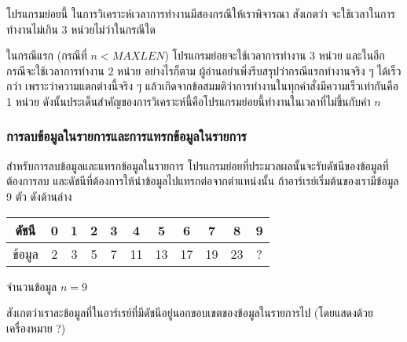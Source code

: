 โปรแกรม{\wbr}ย่อย{\wbr}นี้ ใน{\wbr}การ{\wbr}วิเคราะห์{\wbr}เวลา{\wbr}การ{\wbr}ทำงาน{\wbr}มี{\wbr}สอง{\wbr}กรณี{\wbr}ให้{\wbr}เรา{\wbr}พิจารณา สังเกต{\wbr}ว่า{\wbr}
จะ{\wbr}ใช้{\wbr}เวลา{\wbr}ใน{\wbr}การ{\wbr}ทำงาน{\wbr}ไม่{\wbr}เกิน $3$ หน่วย{\wbr}ไม่{\wbr}ว่า{\wbr}ใน{\wbr}กรณี{\wbr}ใด 

ใน{\wbr}กรณี{\wbr}แรก (กรณี{\wbr}ที่ $n<MAXLEN$) โปรแกรม{\wbr}ย่อย{\wbr}จะ{\wbr}ใช้{\wbr}เวลา{\wbr}การ{\wbr}ทำงาน $3$ หน่วย{\wbr}
และ{\wbr}ใน{\wbr}อีก{\wbr}กรณี{\wbr}จะ{\wbr}ใช้{\wbr}เวลา{\wbr}การ{\wbr}ทำงาน $2$ หน่วย อย่างไร{\wbr}ก็{\wbr}ตาม{\wbr}
ผู้{\wbr}อ่าน{\wbr}อย่า{\wbr}เพิ่ง{\wbr}รีบ{\wbr}สรุป{\wbr}ว่า{\wbr}กรณี{\wbr}แรก{\wbr}ทำงาน{\wbr}จริง ๆ ได้{\wbr}เร็ว{\wbr}กว่า เพราะ{\wbr}ว่า{\wbr}ความ{\wbr}แตก{\wbr}ต่าง{\wbr}นี้{\wbr}จริง ๆ
แล้ว{\wbr}เกิด{\wbr}จาก{\wbr}ข้อ{\wbr}สมมติ{\wbr}ว่า{\wbr}การ{\wbr}ทำงาน{\wbr}ใน{\wbr}ทุก{\wbr}คำ{\wbr}สั่ง{\wbr}มี{\wbr}ความ{\wbr}เร็ว{\wbr}เท่า{\wbr}กัน{\wbr}คือ 1 หน่วย{\wbr}
ดังนั้น{\wbr}ประเด็น{\wbr}สำคัญ{\wbr}ของ{\wbr}การ{\wbr}วิเคราะห์{\wbr}นี้{\wbr}คือ{\wbr}โปรแกรม{\wbr}ย่อย{\wbr}นี้{\wbr}ทำงาน{\wbr}ใน{\wbr}เวลา{\wbr}ที่{\wbr}ไม่{\wbr}ขึ้น{\wbr}กับ{\wbr}ค่า $n$

\subsubsection{การ{\wbr}ลบ{\wbr}ข้อมูล{\wbr}ใน{\wbr}รายการ{\wbr}และ{\wbr}การ{\wbr}แทรก{\wbr}ข้อมูล{\wbr}ใน{\wbr}รายการ}

สำหรับ{\wbr}การ{\wbr}ลบ{\wbr}ข้อมูล{\wbr}และ{\wbr}แทรก{\wbr}ข้อมูล{\wbr}ใน{\wbr}รายการ{\wbr}
โปรแกรม{\wbr}ย่อย{\wbr}ที่{\wbr}ประมวล{\wbr}ผล{\wbr}นั้น{\wbr}จะ{\wbr}รับ{\wbr}ดัชนี{\wbr}ของ{\wbr}ข้อมูล{\wbr}ที่{\wbr}ต้องการ{\wbr}ลบ{\wbr}
และ{\wbr}ดัชนี{\wbr}ที่{\wbr}ต้องการ{\wbr}ให้{\wbr}นำ{\wbr}ข้อมูล{\wbr}ไป{\wbr}แทรก{\wbr}ต่อ{\wbr}จาก{\wbr}ตำแหน่ง{\wbr}นั้น{\wbr}
ถ้า{\wbr}อาร์{\wbr}เรย์{\wbr}เริ่มต้น{\wbr}ของ{\wbr}เรา{\wbr}มี{\wbr}ข้อมูล 9 ตัว ดัง{\wbr}ด้าน{\wbr}ล่าง{\wbr}

\begin{center}
\begin{tabular}{|c|c|c|c|c|c|c|c|c|c|c|}
\hline
ดัชนี & 0 & 1 & 2 & 3 & 4 & 5 & 6 & 7 & 8 & 9\\
\hline
ข้อมูล & 2 & 3 & 5 & 7 & 11 & 13 & 17 & 19 & 23 & ?\\
\hline
\end{tabular}

จำนวน{\wbr}ข้อมูล $n = 9$
\end{center}

สังเกต{\wbr}ว่า{\wbr}เรา{\wbr}ละ{\wbr}ข้อมูล{\wbr}ที่{\wbr}ใน{\wbr}อาร์{\wbr}เรย์{\wbr}ที่{\wbr}มี{\wbr}ดัชนี{\wbr}อยู่{\wbr}นอก{\wbr}ขอบเขต{\wbr}ของ{\wbr}ข้อมูล{\wbr}ใน{\wbr}รายการ{\wbr}ไป{\wbr}
(โดย{\wbr}แสดง{\wbr}ด้วย{\wbr}เครื่องหมาย ?)

